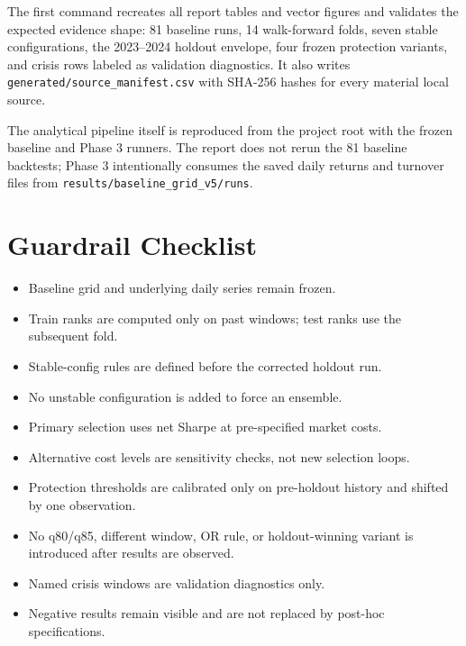 \documentclass[11pt,a4paper]{article}
\begin{document}
The first command recreates all report tables and vector figures and validates the expected evidence shape: 81 baseline runs, 14 walk-forward folds, seven stable configurations, the 2023--2024 holdout envelope, four frozen protection variants, and crisis rows labeled as validation diagnostics. It also writes \texttt{generated/source\_manifest.csv} with SHA-256 hashes for every material local source.

The analytical pipeline itself is reproduced from the project root with the frozen baseline and Phase 3 runners. The report does not rerun the 81 baseline backtests; Phase 3 intentionally consumes the saved daily returns and turnover files from \texttt{results/baseline\_grid\_v5/runs}.

\section{Guardrail Checklist}

\begin{itemize}
  \item Baseline grid and underlying daily series remain frozen.
  \item Train ranks are computed only on past windows; test ranks use the subsequent fold.
  \item Stable-config rules are defined before the corrected holdout run.
  \item No unstable configuration is added to force an ensemble.
  \item Primary selection uses net Sharpe at pre-specified market costs.
  \item Alternative cost levels are sensitivity checks, not new selection loops.
  \item Protection thresholds are calibrated only on pre-holdout history and shifted by one observation.
  \item No q80/q85, different window, OR rule, or holdout-winning variant is introduced after results are observed.
  \item Named crisis windows are validation diagnostics only.
  \item Negative results remain visible and are not replaced by post-hoc specifications.
\end{itemize}
\end{document}
